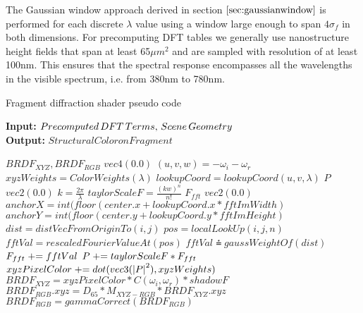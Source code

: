 The Gaussian window approach derived in section $\ref{sec:gaussianwindow}$ is performed for each discrete $\lambda$ value using a window large enough to span $4\sigma_f$ in both dimensions. For precomputing DFT tables we generally use nanostructure height fields that span at least 65$\mu m^2$ and are sampled with resolution of at least 100nm. This ensures that the spectral response encompasses all the wavelengths in the visible spectrum, i.e. from 380nm to 780nm.

\begin{algorithm}[H]
  \caption{Fragment diffraction shader pseudo code}
  \textbf{Input:} $Precomputed \thinspace DFT \thinspace Terms,\thinspace Scene \thinspace Geometry$ \\
  \textbf{Output:} $Structural Color on Fragment$ \\
  \setlength{\fboxrule}{0pt} 
  \begin{boxedminipage}{1.0\textwidth}
  \begin{algorithmic}[1]
      \State \init $BRDF_{XYZ}, BRDF_{RGB}$ \myto $vec4(0.0)$
      \State $(u,v,w) = -\omega_i - \omega_r$
        \State $xyzWeights = ColorWeights(\lambda)$
        \State $lookupCoord = lookupCoord(u, v, \lambda)$
        \State \init $P$ \myto $vec2(0.0)$
        \State $k = \frac{2\pi}{\lambda}$
          \State $taylorScaleF = \frac{(kw)^n}{n!}$
          \State \init $F_{fft}$  \myto $vec2(0.0)$
          \State $anchorX = int(floor(center.x + lookupCoord.x * fftImWidth)$
          \State $anchorY = int(floor(center.y + lookupCoord.y * fftImHeight)$
              \State $dist = distVecFromOriginTo(i,j)$
              \State $pos = localLookUp(i,j,n)$
              \State $fftVal = rescaledFourierValueAt(pos)$
              \State $fftVal \asteq gaussWeightOf(dist)$
              \State $F_{fft} \mathrel{+}= fftVal$
            \EndFor
          \EndFor
          \State $P \mathrel{+}= taylorScaleF*F_{fft}$
        \EndFor
        \State $xyzPixelColor \mathrel{+}= dot(vec3(\left|P\right|^2), xyzWeights)$
      \EndFor
      \State $BRDF_{XYZ} = xyzPixelColor*C(\omega_i, \omega_r)*shadowF$
      \State $BRDF_{RGB}.xyz = D_{65}*M_{XYZ-RGB}*BRDF_{XYZ}.xyz$
      \State $BRDF_{RGB}= gammaCorrect(BRDF_{RGB})$
    \EndFor
  \end{algorithmic}
  \end{boxedminipage}
  \vskip1.5pt
  \label{alg:fragmentshaderall}
\end{algorithm}


